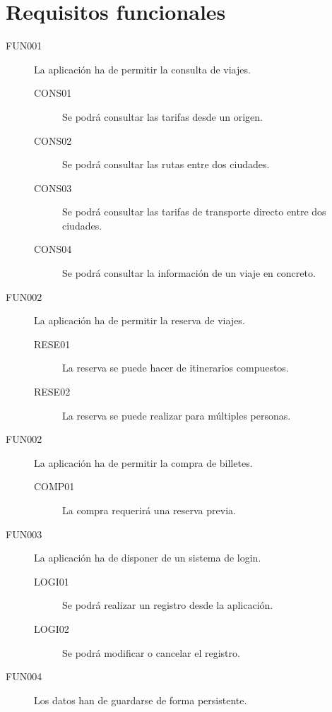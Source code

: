   \section{Requisitos funcionales}
    \begin{description}
      \item[FUN001] La aplicación ha de permitir la consulta de viajes.
      \begin{description}
	\item[CONS01] Se podrá consultar las tarifas desde un origen.
	\item[CONS02] Se podrá consultar las rutas entre dos ciudades.
	\item[CONS03] Se podrá consultar las tarifas de transporte directo entre dos ciudades.
	\item[CONS04] Se podrá consultar la información de un viaje en concreto.
      \end{description}

      \item[FUN002] La aplicación ha de permitir la reserva de viajes.
      \begin{description}
	\item [RESE01] La reserva se puede hacer de itinerarios compuestos.
	\item [RESE02] La reserva se puede realizar para múltiples personas.
      \end{description}

      \item[FUN002] La aplicación ha de permitir la compra de billetes.
      \begin{description}
	\item[COMP01] La compra requerirá una reserva previa.
      \end{description}

      \item[FUN003] La aplicación ha de disponer de un sistema de login.
      \begin{description}
	\item[LOGI01] Se podrá realizar un registro desde la aplicación.
	\item[LOGI02] Se podrá modificar o cancelar el registro.
      \end{description}

      \item[FUN004] Los datos han de guardarse de forma persistente.
    \end{description}


